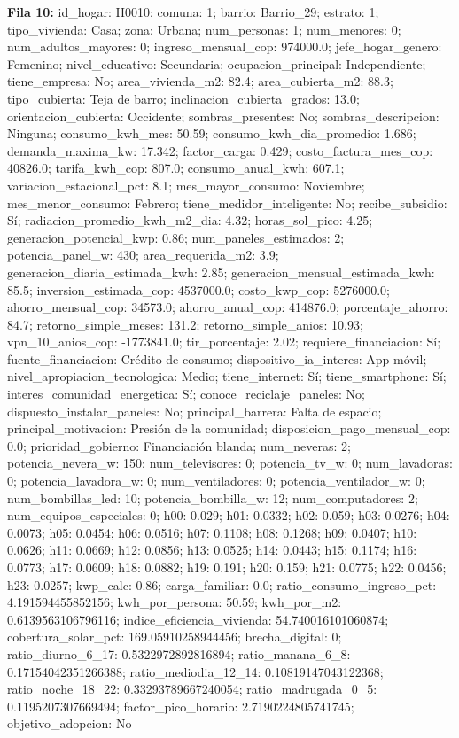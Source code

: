 {\footnotesize\textbf{Fila 10:} id\_hogar: H0010; comuna: 1; barrio: Barrio\_29; estrato: 1; tipo\_vivienda: Casa; zona: Urbana; num\_personas: 1; num\_menores: 0; num\_adultos\_mayores: 0; ingreso\_mensual\_cop: 974000.0; jefe\_hogar\_genero: Femenino; nivel\_educativo: Secundaria; ocupacion\_principal: Independiente; tiene\_empresa: No; area\_vivienda\_m2: 82.4; area\_cubierta\_m2: 88.3; tipo\_cubierta: Teja de barro; inclinacion\_cubierta\_grados: 13.0; orientacion\_cubierta: Occidente; sombras\_presentes: No; sombras\_descripcion: Ninguna; consumo\_kwh\_mes: 50.59; consumo\_kwh\_dia\_promedio: 1.686; demanda\_maxima\_kw: 17.342; factor\_carga: 0.429; costo\_factura\_mes\_cop: 40826.0; tarifa\_kwh\_cop: 807.0; consumo\_anual\_kwh: 607.1; variacion\_estacional\_pct: 8.1; mes\_mayor\_consumo: Noviembre; mes\_menor\_consumo: Febrero; tiene\_medidor\_inteligente: No; recibe\_subsidio: Sí; radiacion\_promedio\_kwh\_m2\_dia: 4.32; horas\_sol\_pico: 4.25; generacion\_potencial\_kwp: 0.86; num\_paneles\_estimados: 2; potencia\_panel\_w: 430; area\_requerida\_m2: 3.9; generacion\_diaria\_estimada\_kwh: 2.85; generacion\_mensual\_estimada\_kwh: 85.5; inversion\_estimada\_cop: 4537000.0; costo\_kwp\_cop: 5276000.0; ahorro\_mensual\_cop: 34573.0; ahorro\_anual\_cop: 414876.0; porcentaje\_ahorro: 84.7; retorno\_simple\_meses: 131.2; retorno\_simple\_anios: 10.93; vpn\_10\_anios\_cop: -1773841.0; tir\_porcentaje: 2.02; requiere\_financiacion: Sí; fuente\_financiacion: Crédito de consumo; dispositivo\_ia\_interes: App móvil; nivel\_apropiacion\_tecnologica: Medio; tiene\_internet: Sí; tiene\_smartphone: Sí; interes\_comunidad\_energetica: Sí; conoce\_reciclaje\_paneles: No; dispuesto\_instalar\_paneles: No; principal\_barrera: Falta de espacio; principal\_motivacion: Presión de la comunidad; disposicion\_pago\_mensual\_cop: 0.0; prioridad\_gobierno: Financiación blanda; num\_neveras: 2; potencia\_nevera\_w: 150; num\_televisores: 0; potencia\_tv\_w: 0; num\_lavadoras: 0; potencia\_lavadora\_w: 0; num\_ventiladores: 0; potencia\_ventilador\_w: 0; num\_bombillas\_led: 10; potencia\_bombilla\_w: 12; num\_computadores: 2; num\_equipos\_especiales: 0; h00: 0.029; h01: 0.0332; h02: 0.059; h03: 0.0276; h04: 0.0073; h05: 0.0454; h06: 0.0516; h07: 0.1108; h08: 0.1268; h09: 0.0407; h10: 0.0626; h11: 0.0669; h12: 0.0856; h13: 0.0525; h14: 0.0443; h15: 0.1174; h16: 0.0773; h17: 0.0609; h18: 0.0882; h19: 0.191; h20: 0.159; h21: 0.0775; h22: 0.0456; h23: 0.0257; kwp\_calc: 0.86; carga\_familiar: 0.0; ratio\_consumo\_ingreso\_pct: 4.191594455852156; kwh\_por\_persona: 50.59; kwh\_por\_m2: 0.6139563106796116; indice\_eficiencia\_vivienda: 54.740016101060874; cobertura\_solar\_pct: 169.05910258944456; brecha\_digital: 0; ratio\_diurno\_6\_17: 0.5322972892816894; ratio\_manana\_6\_8: 0.17154042351266388; ratio\_mediodia\_12\_14: 0.10819147043122368; ratio\_noche\_18\_22: 0.33293789667240054; ratio\_madrugada\_0\_5: 0.1195207307669494; factor\_pico\_horario: 2.7190224805741745; objetivo\_adopcion: No\par}

